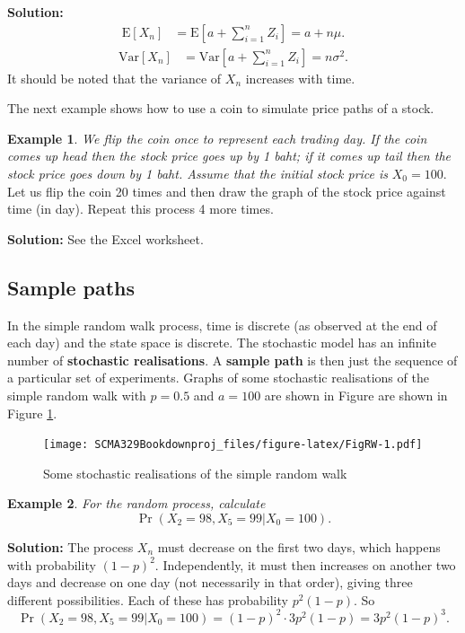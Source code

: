 \documentclass[
]{book}
\theoremstyle{definition}
\theoremstyle{definition}
\newtheorem{example}{Example}[chapter]
\theoremstyle{definition}
\theoremstyle{definition}
\theoremstyle{remark}
\begin{document}
\textbf{Solution:} \[\begin{aligned}
     \mathrm{E}[X_n] &=  \mathrm{E}[a + \sum_{i=1}^n Z_i] = a + n\mu.\end{aligned}\]
\[\begin{aligned}
    \mathrm{Var}[X_n]&= \mathrm{Var}[a + \sum_{i=1}^n Z_i]  = n \sigma^2.\end{aligned}\]
It should be noted that the variance of \(X_n\) increases with time.

The next example shows how to use a coin to simulate price paths of a
stock.

\begin{example}
\emph{We flip the coin once to represent each trading day. If the coin comes
up head then the stock price goes up by 1 baht; if it comes up tail then
the stock price goes down by 1 baht. Assume that the initial stock price
is} \(X_0 = 100\). Let us flip the coin 20 times and then draw the graph
of the stock price against time (in day). Repeat this process 4 more
times.
\end{example}

\textbf{Solution:} See the Excel worksheet.

\hypertarget{sample-paths}{%
\subsection{Sample paths}\label{sample-paths}}

In the simple random walk process, time is discrete (as observed at the
end of each day) and the state space is discrete. The stochastic model
has an infinite number of \textbf{stochastic realisations}. A \textbf{sample path}
is then just the sequence of a particular set of experiments. Graphs of
some stochastic realisations of the simple random walk with \(p = 0.5\)
and \(a = 100\) are shown in Figure are shown in Figure \ref{fig:FigRW}.

\begin{figure}
\centering
\texttt{[image: SCMA329Bookdownproj\_files/figure-latex/FigRW-1.pdf]}
\caption{\label{fig:FigRW}Some stochastic realisations of the simple random walk}
\end{figure}

\begin{example}
\emph{For the random process, calculate}
\[\Pr(X_2 = 98, X_5 = 99 | X_0 = 100).\]
\end{example}

\textbf{Solution:} The process \(X_n\) must decrease on the first two days,
which happens with probability \((1-p)^2\). Independently, it must then
increases on another two days and decrease on one day (not necessarily
in that order), giving three different possibilities. Each of these has
probability \(p^2(1-p)\). So
\[\Pr(X_2 = 98, X_5 = 99 | X_0 = 100) = (1-p)^2 \cdot 3 p^2(1-p) = 3p^2(1-p)^3.\]
\end{document}
